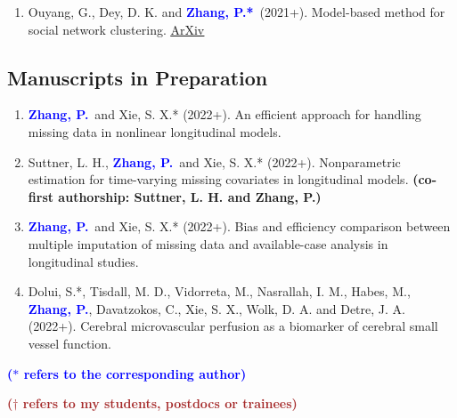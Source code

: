 \documentclass{res}
\newcommand{\PZ}{\textbf{\textcolor{blue}{Zhang, P.*}}}
\newcommand{\PZnot}{\textbf{\textcolor{blue}{Zhang, P.}}}
\begin{document}
\begin{resume}
\begin{enumerate}
	\item {\sc Ouyang, G., Dey, D. K.} and \PZ\ (2021+). 
	Model-based method for social network clustering. 
	\href{https://arxiv.org/pdf/1708.07604.pdf}{\underline{ArXiv}}
\end{enumerate}

\subsection{Manuscripts in Preparation}
\begin{enumerate}
	\item \PZnot\ and {\sc Xie, S. X.*} (2022+). An efficient 
	approach for handling missing data in nonlinear longitudinal
	models.	
	\item {\sc Suttner, L. H.,} \PZnot\ and {\sc Xie, S. X.*} 
	(2022+). Nonparametric estimation for time-varying missing 
	covariates in longitudinal models.  {\bf \small (co-first 
	authorship: Suttner, 
	L. H. and Zhang, P.)}
	\item \PZnot\ and {\sc Xie, S. X.*} (2022+). Bias 
	and efficiency comparison between multiple imputation of missing 
	data and available-case analysis in longitudinal studies. 
	\item {\sc Dolui, S.*, Tisdall, M. D., Vidorreta, M., 
	Nasrallah, I. M., Habes, M.}, \PZnot, {\sc 
	Davatzokos, C., Xie, S. X., Wolk, D. A.} and {\sc Detre, J. A.} 
	(2022+). Cerebral microvascular perfusion as a biomarker of 
	cerebral small vessel function.
\end{enumerate}

{\bf \textcolor{blue}{($\ast$ refers to the corresponding author)}}

{\bf \textcolor{brown}{($\dagger$ refers to my students, postdocs 
or trainees)}}


\end{resume}
\end{document}
